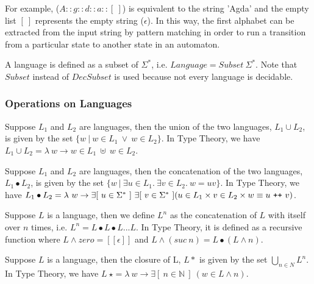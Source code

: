 \par For example, (\(A :: g :: d :: a :: [\ ]\)) is equivalent to the
string 'Agda' and the empty list \([\ ]\)
represents the empty string (\(\epsilon\)). In this way, the first
alphabet can be extracted from the input string by pattern matching in order to
run a transition from a particular state to another state in an automaton. 

\begin{defn}
\noindent A language is defined as a subset of 
\(\Sigma^*\), i.e. \(Language = Subset\ \Sigma^*\). 
Note that \(Subset\) instead of \(DecSubset\) is used because not
every language is decidable. 
\end{defn}

\subsubsection{Operations on Languages}

\begin{defn} 
\label{defn:lang_union}
\noindent Suppose \(L_1\) and \(L_2\) are languages, then the union of
the two languages, \(L_1\cup L_2\), is given by the set \(\{w\
|\  w \in L_1\ \vee \ w \in L_2\}\). In Type Theory, we have \(L_1 \cup L_2 = \lambda\ w
\to w \in L_1\ \uplus\ w \in L_2\).
\end{defn}

\begin{defn}
\label{defn:lang_con}
\noindent Suppose \(L_1\) and \(L_2\) are languages, then
the concatenation of the two languages, \(L_1\bullet L_2\), is given
by the set \(\{w\  |\  \exists u\in L_1.\ \exists v\in L_2.\ w = uv\}\). In
Type Theory, we have \(L_1\bullet L_2 = \lambda\ w \to \exists[\
u \in \Sigma^*\ ]\ \exists[\ v \in \Sigma^*\ ] (u \in L_1 \times v \in
L_2 \times w \equiv u\ \texttt{+}\texttt{+}\  v )\).
\end{defn}

\begin{defn}
\label{defn:lang_power}
\noindent Suppose \(L\) is a language, then we define \(L^n\) as
the concatenation of \(L\) with itself over \(n\) times, i.e. \(L^n =
L\bullet L\bullet L ... L\). In Type Theory, it is defined as a recursive function where \(L \wedge zero = [\![\epsilon ]\!]\) and
\(L \wedge (suc\ n) = L \bullet (L \wedge n)\). 
\end{defn}

\begin{defn}
\label{defn:lang_star}
\noindent Suppose \(L\) is a language, then the closure of
L, \(L\ast\) is given by the set \(\bigcup_{n \in N} L^n\). In Type
Theory, we have \(L\ \star = \lambda\ w \to \exists [\ n \in \mathbb{N}\
]\ (w \in L \wedge n)\). 
\end{defn}


